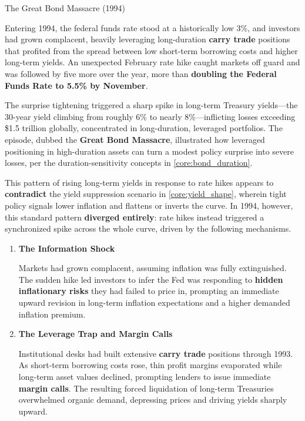 \documentclass[10pt]{article}
\begin{document}
    \begin{core}{The Great Bond Massacre (1994)}

      Entering 1994, the federal funds rate stood at a historically low 3\%, and investors had grown complacent, heavily leveraging long-duration \textbf{carry trade} positions that profited from the spread between low short-term borrowing costs and higher long-term yields. An unexpected February rate hike caught markets off guard and was followed by five more over the year, more than \textbf{doubling the Federal Funds Rate to 5.5\% by November}.

      The surprise tightening triggered a sharp spike in long-term Treasury yields---the 30-year yield climbing from roughly 6\% to nearly 8\%---inflicting losses exceeding \$1.5 trillion globally, concentrated in long-duration, leveraged portfolios. The episode, dubbed the \textbf{Great Bond Massacre}, illustrated how leveraged positioning in high-duration assets can turn a modest policy surprise into severe losses, per the duration-sensitivity concepts in \autoref{core:bond_duration}.

      This pattern of rising long-term yields in response to rate hikes appears to \textbf{contradict} the yield suppression scenario in \autoref{core:yield_shape}, wherein tight policy signals lower inflation and flattens or inverts the curve. In 1994, however, this standard pattern \textbf{diverged entirely}: rate hikes instead triggered a synchronized spike across the whole curve, driven by the following mechanisms.

      \begin{enumerate}

        \item \textbf{The Information Shock}

        Markets had grown complacent, assuming inflation was fully extinguished. The sudden hike led investors to infer the Fed was responding to \textbf{hidden inflationary risks} they had failed to price in, prompting an immediate upward revision in long-term inflation expectations and a higher demanded inflation premium.

        \item \textbf{The Leverage Trap and Margin Calls}

        Institutional desks had built extensive \textbf{carry trade} positions through 1993. As short-term borrowing costs rose, thin profit margins evaporated while long-term asset values declined, prompting lenders to issue immediate \textbf{margin calls}. The resulting forced liquidation of long-term Treasuries overwhelmed organic demand, depressing prices and driving yields sharply upward.


\end{enumerate}
\end{core}
\end{document}
